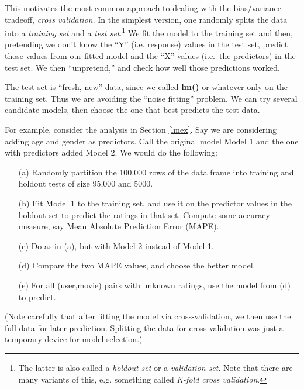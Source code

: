 This motivates the most common approach to dealing with the
bias/variance tradeoff, \textit{cross validation}.  In the simplest
version, one randomly splits the data into a \textit{training set} and a
\textit{test set}.\footnote{The latter is also called a \textit{holdout
set} or a \textit{validation set}.  Note that there are many variants of
this, e.g. something called \textit{K-fold cross validation}.}  We fit
the model to the training set and then, pretending we don't know the
``Y'' (i.e. response) values in the test set, predict those values from
our fitted model and the ``X'' values (i.e.\ the predictors) in the test
set.  We then ``unpretend,'' and check how well those predictions
worked. 

The test set is ``fresh, new'' data, since we called \textbf{lm()} or
whatever only on the training set.  Thus we are avoiding the ``noise
fitting'' problem.  We can try several candidate models, then choose the
one that best predicts the test data.

For example, consider the analysis in Section \ref{lmex}.  Say we are
considering adding age and gender as predictors.  Call the original
model Model 1 and the one with predictors added Model 2.  We would do
the following:

\begin{itemize}

\item [(a)] Randomly partition the 100,000 rows of the data frame into
training and holdout tests of size 95,000 and 5000.

\item [(b)] Fit Model 1 to the training set, and use it on the predictor
values in the holdout set to predict the ratings in that set.  Compute
some accuracy measure, say Mean Absolute Prediction Error (MAPE).

\item [(c)] Do as in (a), but with Model 2 instead of Model 1.

\item [(d)] Compare the two MAPE values, and choose the better model.

\item [(e)] For all (user,movie) pairs with unknown ratings, use the
model from (d) to predict.

\end{itemize} 

(Note carefully that after fitting the model via cross-validation, we
then use the full data for later prediction.  Splitting the data for
cross-validation was just a temporary device for model selection.)


